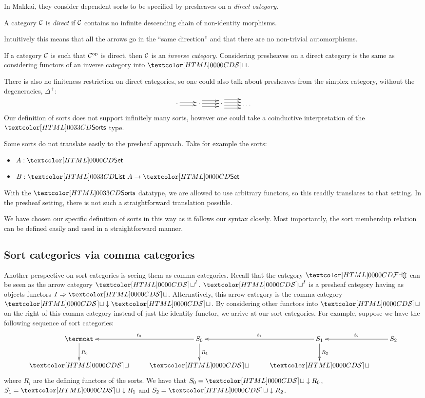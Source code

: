 In Makkai, they consider dependent sorts to be specified by presheaves
on a \emph{direct category}.
\begin{definition}
  A category $\mathcal{C}$ is \emph{direct} if $\mathcal{C}$ contains no infinite
  descending chain of non-identity morphisms.
\end{definition}
Intuitively this means that all the arrows go in the ``same
direction'' and that there are no non-trivial automorphisms.

If a category $\mathcal{C}$ is such that ${\mathcal{C}}^{\mathrm{op}}$ is direct, then $\mathcal{C}$
is an \emph{inverse category}. Considering presheaves on a direct
category is the same as considering functors of an inverse category
into $\SET$.

There is also no finiteness restriction on direct categories, so one
could also talk about presheaves from the simplex category, without
the degeneracies, $\Delta^+$:
$$
\xymatrix{
\cdot     
\ar@<-.5ex>[r]
\ar@<.5ex>[r]
&\cdot
\ar@<-1ex>[r]
\ar@<0ex>[r]
\ar@<1ex>[r]
&\cdot
\ar@<-1.5ex>[r]
\ar@<-.5ex>[r]
\ar@<.5ex>[r]
\ar@<1.5ex>[r]
&\hdots
}
$$
Our definition of sorts does not support infinitely many sorts,
however one could take a coinductive interpretation of the $\sortsty$
type.

Some sorts do not translate easily to the presheaf approach. Take for
example the sorts:
\begin{itemize}
\item $A : \Set$
\item $B : \List\ A \to \Set$
\end{itemize}
With the $\sortsty$ datatype, we are allowed to use arbitrary
functors, so this readily translates to that setting. In the presheaf
setting, there is not such a straightforward translation possible.

We have chosen our specific definition of sorts in this way as it
follows our syntax closely. Most importantly, the sort membership
relation can be defined easily and used in a straightforward manner.

\subsection{Sort categories via comma categories}

Another perspective on sort categories is seeing them as comma
categories. Recall that the category $\FAM$ can be seen as the arrow
category $\SET^I$. $\SET^I$ is a presheaf category having as objects
functors $\Func{I}{\SET}$. Alternatively, this arrow category is the
comma category $\SET \downarrow \SET$. By considering other functors
into $\SET$ on the right of this comma category instead of just the
identity functor, we arrive at our sort categories. For example,
suppose we have the following sequence of sort categories:
$$
\xymatrix{
\termcat
\ar[d]^{R_0}
&S_0
\ar[d]^{R_1}
\ar[l]_{t_0}
&S_1
\ar[d]^{R_2}
\ar[l]_{t_1}
&S_2
\ar[l]_{t_2} \\
\SET
&\SET
&\SET
}
$$
where $R_i$ are the defining functors of the sorts. We have that
$S_0 = \SET \downarrow R_0$, $S_1 = \SET \downarrow R_1$ and
$S_2 = \SET \downarrow R_2$.

